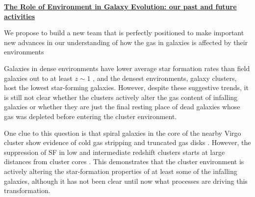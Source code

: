 \documentclass[11pt]{article}
\begin{document}
\newpage

\centerline{{\bf \underline{ The Role of Environment in Galaxy Evolution: our past and future activities}}}
\medskip


We propose to build a new team that is perfectly positioned to make important new advances in our understanding of how the gas in galaxies is affected by their environments


 Galaxies in dense environments
have lower average star formation rates than field galaxies out
to at least $z \sim 1$ \citep[e.g.][]{Poggianti99,Lewis02,Gomez03,Postman05}, and the densest environments, galaxy clusters, host the lowest star-forming galaxies. 
However, despite these suggestive trends, it is still not clear whether the clusters actively alter the gas content
of infalling galaxies or whether they are just the final resting place of
dead galaxies whose gas was depleted before entering the cluster
environment.  

One clue to this question is that spiral galaxies in the core of the nearby Virgo cluster show evidence of cold gas stripping and truncated gas disks \citep{Koopmann98,Koopmann04,Dale01,Crowl05,Chung07}.   However, the suppression of SF in low and intermediate redshift clusters starts at large distances from cluster cores \citep{Lewis02,Gomez03,Laigle18}.  This demonstrates that the cluster environment is actively altering the star-formation properties of at least some of the infalling galaxies, although it has not been clear until now what processes are driving this transformation.  
\end{document}
